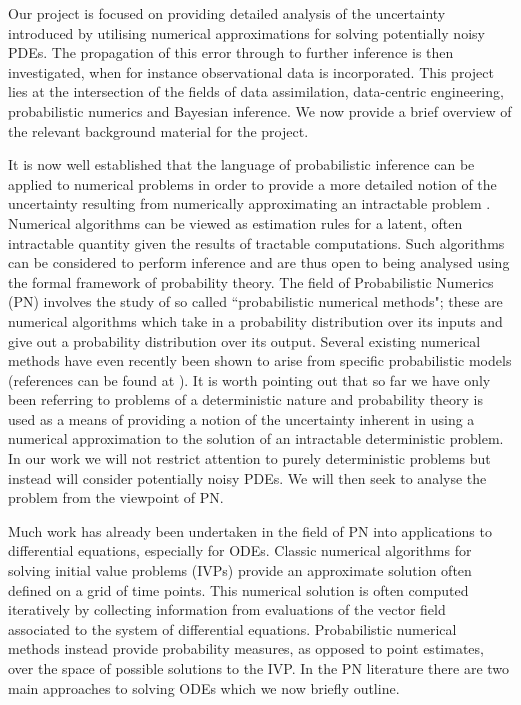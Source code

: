 Our project is focused on providing detailed analysis of the uncertainty introduced by utilising numerical approximations for solving potentially noisy PDEs. The propagation of this error through to further inference is then investigated, when for instance observational data is incorporated. This project lies at the intersection of the fields of data assimilation, data-centric engineering, probabilistic numerics and Bayesian inference. We now provide a brief overview of the relevant background material for the project.

It is now well established that the language of probabilistic inference can be applied to numerical problems in order to provide a more detailed notion of the uncertainty resulting from numerically approximating an intractable problem \textcolor{blue}{\cite{diaconis1988bayesian,o1992bayesian,skilling1992bayesian,hennig2015probabilistic}}. Numerical algorithms can be viewed as estimation rules for a latent, often intractable quantity given the results of tractable computations. Such algorithms can be considered to perform inference and are thus open to being analysed using the formal framework of probability theory. The field of Probabilistic Numerics (PN) \textcolor{blue}{\cite{probNumericsSite}} involves the study of so called ``probabilistic numerical methods"; these are numerical algorithms which take in a probability distribution over its inputs and give out a probability distribution over its output. Several existing numerical methods have even recently been shown to arise from specific probabilistic models (references can be found at \textcolor{blue}{\cite{probNumericsSite}}). It is worth pointing out that so far we have only been referring to problems of a deterministic nature and probability theory is used as a means of providing a notion of the uncertainty inherent in using a numerical approximation to the solution of an intractable deterministic problem. In our work we will not restrict attention to purely deterministic problems but instead will consider potentially noisy PDEs. We will then seek to analyse the problem from the viewpoint of PN.

Much work has already been undertaken in the field of PN into applications to differential equations, especially for ODEs. Classic numerical algorithms for solving initial value problems (IVPs) provide an approximate solution often defined on a grid of time points. This numerical solution is often computed iteratively by collecting information from evaluations of the vector field associated to the system of differential equations. Probabilistic numerical methods instead provide probability measures, as opposed to point estimates, over the space of possible solutions to the IVP. In the PN literature there are two main approaches to solving ODEs which we now briefly outline.

